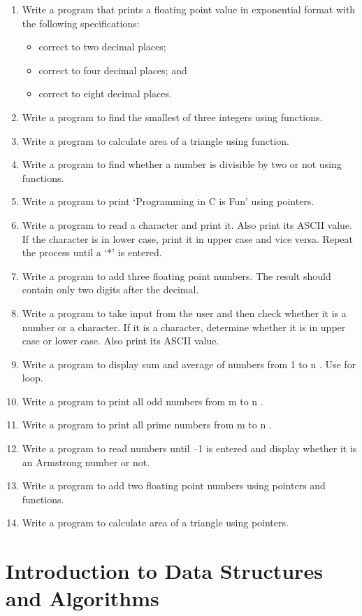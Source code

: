\documentclass[fontsize=12pt,paper=a4]{book}
\begin{document}
\begin{enumerate}
 \item Write a program that prints a floating point value in exponential format with the following
       specifications:
       \begin{itemize}
        \item correct to two decimal places;
        \item correct to four decimal places; and
        \item correct to eight decimal places.
       \end{itemize}
 \item Write a program to find the smallest of three integers using functions.
 \item Write a program to calculate area of a triangle using function.
 \item Write a program to find whether a number is divisible by two or not using functions.
 \item Write a program to print ‘Programming in C is Fun’ using pointers.
 \item Write a program to read a character and print it. Also print its ASCII value. If the character is in lower case, print it in upper case and vice versa. Repeat the process until a ‘*’ is entered.
 \item Write a program to add three floating point numbers. The result should contain only two digits
       after the decimal.
 \item Write a program to take input from the user and then check whether it is a number or a
       character. If it is a character, determine whether it is in upper case or lower case. Also print its ASCII value.
 \item Write a program to display sum and average of numbers from 1 to n . Use for loop.
 \item Write a program to print all odd numbers from m to n .
 \item Write a program to print all prime numbers from m to n .
 \item Write a program to read numbers until –1 is entered and display whether it is an Armstrong
       number or not.
 \item Write a program to add two floating point numbers using pointers and functions.
 \item Write a program to calculate area of a triangle using pointers.
\end{enumerate}

\chapter{Introduction to Data Structures and Algorithms}
\end{document}
